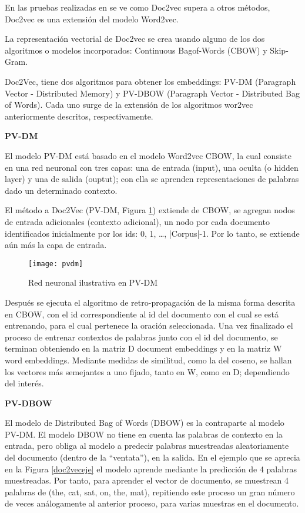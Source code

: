 En las pruebas realizadas en \cite{capello2018sistema} se ve como Doc2vec supera a otros métodos,
Doc2vec es una extensión del modelo Word2vec.  

La representación vectorial de Doc2vec se crea usando alguno de los dos algoritmos o modelos incorporados: Continuous Bagof-Words (CBOW) y Skip-Gram.

Doc2Vec, tiene dos algoritmos para obtener los embeddings: PV-DM (Paragraph Vector - Distributed Memory) y PV-DBOW (Paragraph Vector - Distributed Bag of Words). Cada uno surge de la extensión de los algoritmos wor2vec anteriormente descritos, respectivamente.

\textbf{PV-DM}

El modelo PV-DM está basado en el modelo Word2vec CBOW, la cual consiste en una red neuronal con tres capas: una de entrada (input), una oculta (o hidden layer) y una de salida (ouptut); con ella se aprenden representaciones de palabras dado un determinado contexto.

El método a Doc2Vec (PV-DM, Figura \ref{pvdm}) extiende de CBOW, se agregan nodos de entrada adicionales (contexto adicional), un nodo por cada documento identificados inicialmente por los ids: 0, 1, …, |Corpus|-1. Por lo tanto, se extiende aún más la capa de entrada.

\begin{figure}[H]
\texttt{[image: pvdm]}
\caption{Red neuronal ilustrativa en PV-DM \cite{capello2018sistema}}
\label{pvdm}
\end{figure}


Después se ejecuta el algoritmo de retro-propagación de la misma forma descrita en CBOW, con el id correspondiente al id del documento con el cual se está entrenando, para el cual pertenece la oración seleccionada.  Una vez finalizado el proceso de entrenar contextos de palabras junto con el id del documento, se terminan obteniendo en la matriz D document embeddings y en la matriz W word embeddings. Mediante medidas de similitud, como la del coseno, se hallan los vectores más semejantes a uno fijado, tanto en W, como en D; dependiendo del interés.

\textbf{PV-DBOW}

El modelo de Distributed Bag of Words (DBOW) es la contraparte al modelo PV-DM. El modelo DBOW no tiene en cuenta las palabras de contexto en la entrada, pero obliga al modelo a predecir palabras muestreadas aleatoriamente del documento (dentro de la “ventata”), en la salida. En el ejemplo que se aprecia en la
Figura  \ref{doc2veceje} el modelo aprende mediante  la predicción de 4 palabras muestreadas. Por tanto, para aprender el vector de documento, se muestrean 4 palabras de (the, cat, sat, on, the, mat), repitiendo este proceso un gran número de veces análogamente al anterior proceso, para varias muestras en el documento.

